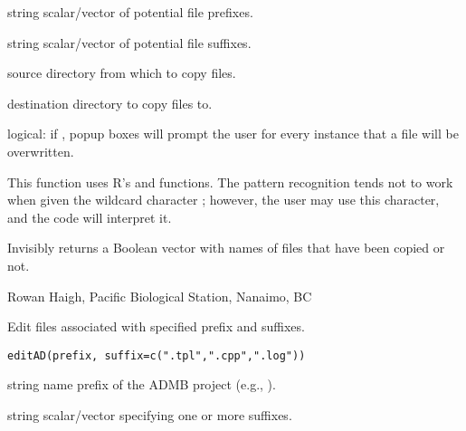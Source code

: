 \documentclass[letterpaper]{book}
\begin{document}
%
\begin{Arguments}
\begin{ldescription}
\item[\code{prefix}]  string scalar/vector of potential file prefixes. 
\item[\code{suffix}]  string scalar/vector of potential file suffixes. 
\item[\code{srcdir}]  source directory from which to copy files. 
\item[\code{dstdir}]  destination directory to copy files to. 
\item[\code{ask}]  logical: if , popup boxes will prompt the user
for every instance that a file will be overwritten. 
\end{ldescription}
\end{Arguments}
%
\begin{Details}\relax
This function uses R's  and  functions.
The pattern recognition tends not to work when given the wildcard character
\code{*}; however, the user may use this character, and the code will interpret it.
\end{Details}
%
\begin{Value}
Invisibly returns a Boolean vector with names of files that have been copied or not.
\end{Value}
%
\begin{Author}\relax
 Rowan Haigh, Pacific Biological Station, Nanaimo, BC 
\end{Author}
%
\begin{SeeAlso}\relax
\end{SeeAlso}
%
\begin{Description}\relax
Edit files associated with specified prefix and suffixes.
\end{Description}
%
\begin{Usage}
\begin{verbatim}
editAD(prefix, suffix=c(".tpl",".cpp",".log"))
\end{verbatim}
\end{Usage}
%
\begin{Arguments}
\begin{ldescription}
\item[\code{prefix}] string name prefix of the ADMB project (e.g., ).
\item[\code{suffix}] string scalar/vector specifying one or more suffixes.
\end{ldescription}
\end{Arguments}
\end{document}
